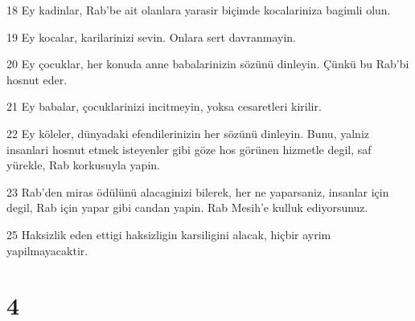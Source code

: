 \par 18 Ey kadinlar, Rab'be ait olanlara yarasir biçimde kocalariniza bagimli olun.
\par 19 Ey kocalar, karilarinizi sevin. Onlara sert davranmayin.
\par 20 Ey çocuklar, her konuda anne babalarinizin sözünü dinleyin. Çünkü bu Rab'bi hosnut eder.
\par 21 Ey babalar, çocuklarinizi incitmeyin, yoksa cesaretleri kirilir.
\par 22 Ey köleler, dünyadaki efendilerinizin her sözünü dinleyin. Bunu, yalniz insanlari hosnut etmek isteyenler gibi göze hos görünen hizmetle degil, saf yürekle, Rab korkusuyla yapin.
\par 23 Rab'den miras ödülünü alacaginizi bilerek, her ne yaparsaniz, insanlar için degil, Rab için yapar gibi candan yapin. Rab Mesih'e kulluk ediyorsunuz.
\par 25 Haksizlik eden ettigi haksizligin karsiligini alacak, hiçbir ayrim yapilmayacaktir.

\chapter{4}

